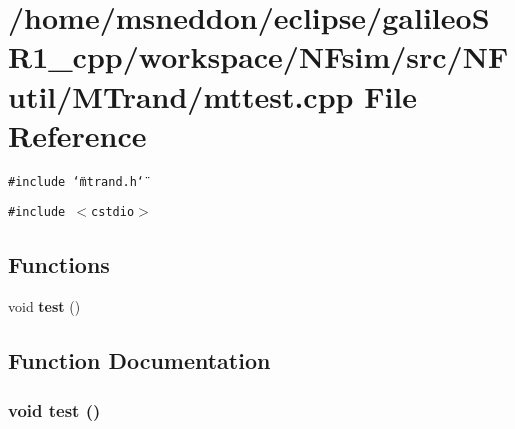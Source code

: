 \section{/home/msneddon/eclipse/galileoSR1\_\-cpp/workspace/NFsim/src/NFutil/MTrand/mttest.cpp File Reference}
\label{mttest_8cpp}


{\tt \#include \char`\"{}mtrand.h\char`\"{}}\par
{\tt \#include $<$cstdio$>$}\par
\subsection*{Functions}
\begin{CompactItemize}
\item 
void {\bf test} ()
\end{CompactItemize}


\subsection{Function Documentation}
\subsubsection{\setlength{\rightskip}{0pt plus 5cm}void test ()}\label{mttest_8cpp_e1a3968e7947464bee7714f6d43b7002}


